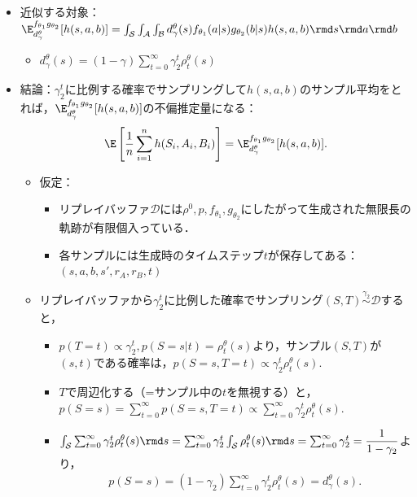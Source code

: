 \documentclass[a4paper,10pt,dvipdfmx]{jsarticle}
\begin{document}
\begin{itemize}
    \item 近似する対象：$\E_{d_{\gamma}^{\theta}}^{f_{\theta_1}g_{\theta_2}}[h(s,a,b)]=\int_{\mathcal{S}}\int_{\mathcal{A}}\int_{\mathcal{B}}d_{\gamma}^{\theta}(s)f_{\theta_1}(a|s)g_{\theta_2}(b|s)h(s,a,b)
            \rmd s\rmd a\rmd b$
        \begin{itemize}
            \item $d_{\gamma}^{\theta}(s)=(1-\gamma)\sum_{t=0}^{\infty}\gamma_2^t\rho_t^\theta(s)$
        \end{itemize}
    \item 結論：$\gamma_2^t$に比例する確率でサンプリングして$h(s,a,b)$のサンプル平均をとれば，$\E_{d_{\gamma}^{\theta}}^{f_{\theta_1}g_{\theta_2}}[h(s,a,b)]$の不偏推定量になる：
    \begin{align}
        \E\left[\dfrac{1}{n}\sum_{i=1}^nh(S_i,A_i,B_i)\right]=\E_{d_{\gamma}^{\theta}}^{f_{\theta_1}g_{\theta_2}}[h(s,a,b)].
    \end{align}
    \begin{itemize}
        \item 仮定：
        \begin{itemize}
            \item リプレイバッファ$\mathcal{D}$には$\rho^0,p,f_{\theta_1},g_{\theta_2}$にしたがって生成された無限長の軌跡が有限個入っている．
            \item 各サンプルには生成時のタイムステップ$t$が保存してある：$(s,a,b,s',r_A,r_B,t)$
        \end{itemize}
        \item リプレイバッファから$\gamma_2^t$に比例した確率でサンプリング$(S,T)\overset{\gamma_2}{\sim}\mathcal{D}$すると，
        \begin{itemize}
            \item $p(T=t)\propto\gamma_2^t, p(S=s|t)=\rho_t^\theta(s)$より，サンプル$(S,T)$が$(s,t)$である確率は，$p(S=s,T=t)\propto\gamma_2^t\rho_t^\theta(s)$.
            \item $T$で周辺化する（=サンプル中の$t$を無視する）と，$p(S=s)=\sum_{t=0}^\infty p(S=s,T=t)\propto\sum_{t=0}^\infty\gamma_2^t\rho_t^\theta(s)$.
            \item $\int_{\mathcal{S}}\sum_{t=0}^\infty\gamma_2^t\rho_t^\theta(s)\rmd s=\sum_{t=0}^\infty\gamma_2^t\int_{\mathcal{S}}\rho_t^\theta(s)\rmd s=\sum_{t=0}^\infty\gamma_2^t=\dfrac{1}{1-\gamma_2}$より，
            \begin{align}
                p(S=s)=(1-\gamma_2)\sum_{t=0}^\infty\gamma_2^t\rho_t^\theta(s)=d_{\gamma}^{\theta}(s).

\end{align}
\end{itemize}
\end{itemize}
\end{itemize}
\end{document}
